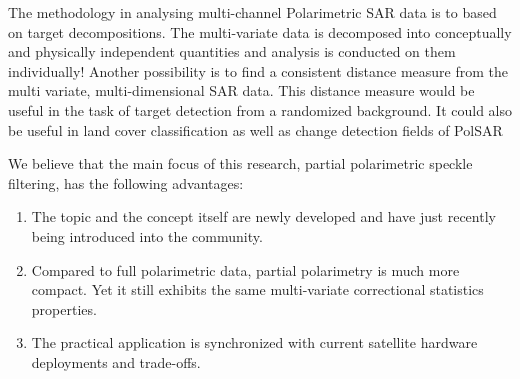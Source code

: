 The methodology in analysing multi-channel Polarimetric SAR data is to based on target decompositions.
The multi-variate data is decomposed into conceptually and physically independent quantities and analysis is conducted on them individually!
Another possibility is to find a consistent distance measure from the multi variate, multi-dimensional SAR data.
This distance measure would be useful in the task of target detection from a randomized background.
It could also be useful in land cover classification as well as change detection fields of PolSAR

We believe that the main focus of this research, partial polarimetric speckle filtering, has the following advantages:
\begin{enumerate}
\item The topic and the concept itself are newly developed and have just recently being introduced into the community.
\item Compared to full polarimetric data, partial polarimetry is much more compact.
Yet it still exhibits the same multi-variate correctional statistics properties. 
\item The practical application is synchronized with current satellite hardware deployments and trade-offs.
\end{enumerate}

